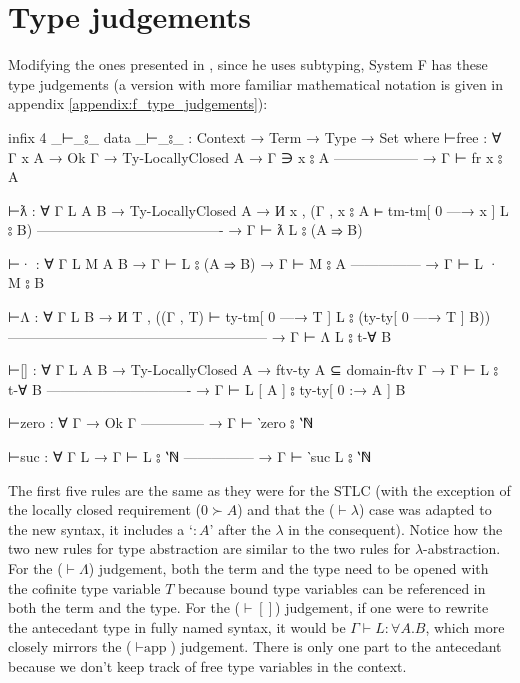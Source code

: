 \documentclass[logo,bsc,singlespacing,parskip,online]{infthesis}
\begin{document}
\section{Type judgements}
\label{chapter3:type_judgements}
Modifying the ones presented in \citet{chargueraud_locally_2012}, since he uses subtyping, System F
has these type judgements (a version with more familiar mathematical notation is given in appendix \ref{appendix:f_type_judgements}):
\begin{code}
  infix  4 _⊢_⦂_
  data _⊢_⦂_ : Context → Term → Type → Set where
    ⊢free : ∀ {Γ x A}
      → Ok Γ
      → Ty-LocallyClosed A
      → Γ ∋ x ⦂ A
        ------------------
      → Γ ⊢ fr x ⦂ A

    ⊢ƛ : ∀ {Γ L A B}
      → Ty-LocallyClosed A
      → И x , (Γ , x ⦂ A ⊢ tm-tm[ 0 —→ x ] L ⦂ B)
        ----------------------------------------
      → Γ ⊢ ƛ L ⦂ (A ⇒ B)

    ⊢· : ∀ {Γ L M A B}
      → Γ ⊢ L ⦂ (A ⇒ B)
      → Γ ⊢ M ⦂ A
        ---------------
      → Γ ⊢ L · M ⦂ B

    ⊢Λ : ∀ {Γ L B}
      → И T , ((Γ , T) ⊢ ty-tm[ 0 —→ T ] L ⦂ (ty-ty[ 0 —→ T ] B))
        --------------------------------------------------------
      → Γ ⊢ Λ L ⦂ t-∀ B

    ⊢[] : ∀ {Γ L A B}
      → Ty-LocallyClosed A
      → ftv-ty A ⊆ domain-ftv Γ
      → Γ ⊢ L ⦂ t-∀ B
        -------------------------------
      → Γ ⊢ L [ A ] ⦂ ty-ty[ 0 :→ A ] B

    ⊢zero : ∀ {Γ}
      → Ok Γ
        --------------
      → Γ ⊢ ‵zero ⦂ ‵ℕ

    ⊢suc : ∀ {Γ L}
      → Γ ⊢ L ⦂ ‵ℕ
        ---------------
      → Γ ⊢ ‵suc L ⦂ ‵ℕ
\end{code}

The first five rules are the same as they were for the STLC (with the exception of the locally
closed requirement ($0 \succ A$) and that the ($\vdash \lambda$) case was adapted to the new syntax,
it includes a `$\colon A$' after the $\lambda$ in the consequent). Notice how the two new rules for
type abstraction are similar to the two rules for $\lambda$-abstraction. For the ($\vdash\Lambda$)
judgement, both the term and the type need to be opened with the cofinite type variable $T$ because
bound type variables can be referenced in both the term and the type. For the ($\vdash[]$)
judgement, if one were to rewrite the antecedant type in fully named syntax, it would be $\Gamma
\vdash L \colon \forall A. B$, which more closely mirrors the ($\vdash\text{app}$) judgement. There
is only one part to the antecedant because we don't keep track of free type variables in the
context.
\end{document}
